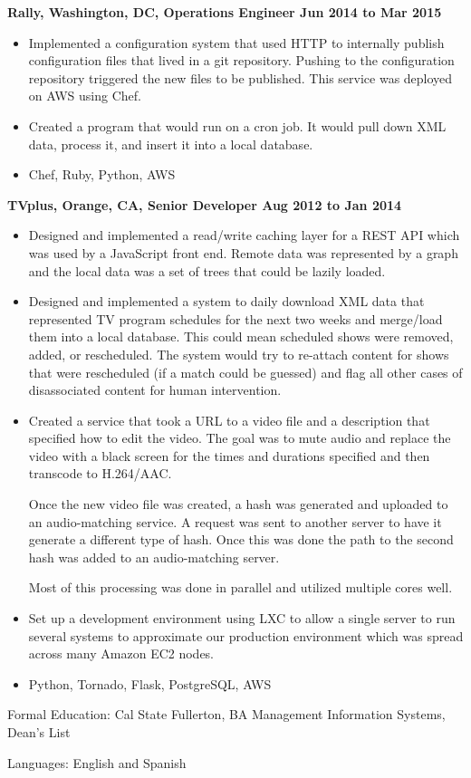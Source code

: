 \documentclass{res}
\begin{document}
\begin{resume}
  {\large \bf Rally, Washington, DC, Operations Engineer \hfill Jun 2014 to Mar 2015}

  \begin{itemize}

  \item
    Implemented a configuration system that used HTTP to
    internally publish configuration files that lived in a git repository.
    Pushing to the configuration repository triggered the new files
    to be published.  This service was deployed on AWS using Chef.
  \item
    Created a program that would run on a cron job.  It would pull down
    XML data, process it, and insert it into a local database.
  \item
    Chef, Ruby, Python, AWS
  \end{itemize}

  {\large \bf TVplus, Orange, CA, Senior Developer \hfill Aug 2012 to Jan 2014}

  \begin{itemize}

  \item
    Designed and implemented a read/write caching layer for a
    REST API which was used by a JavaScript front end.
    Remote data was represented by a graph and the
    local data was a set of trees that could be lazily loaded. 

  \item
    Designed and implemented a system to daily download XML data
    that represented TV program schedules for the next two weeks and
    merge/load them into a local database.  This could mean scheduled
    shows were removed, added, or rescheduled.  The system would try
    to re-attach content for shows that were rescheduled (if a match
    could be guessed) and flag all other cases of disassociated content
    for human intervention.

  \item
    Created a service that took a URL to a video file and a description
    that specified how to edit the video.  The goal was to mute audio
    and replace the video with a black screen for the times and durations
    specified and then transcode to H.264/AAC.

    Once the new video file was created, a hash was generated and uploaded
    to an audio-matching service. A request was sent to another server
    to have it generate a different type of hash.  Once this was done
    the path to the second hash was added to an audio-matching server.

    Most of this processing was done in parallel and utilized multiple cores
    well.

  \item
    Set up a development environment using LXC to allow a single server to
    run several systems to approximate our production environment which
    was spread across many Amazon EC2 nodes.
  \item
    Python, Tornado, Flask, PostgreSQL, AWS
  \end{itemize}
Formal Education: Cal State Fullerton, BA Management Information
Systems, Dean's List

Languages: English and Spanish
\end{resume}
\end{document}
